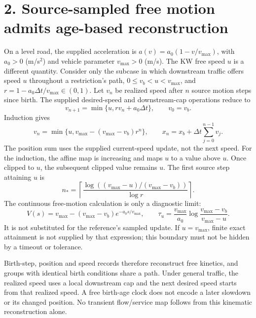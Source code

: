 \documentclass[11pt,a4paper]{article}
\begin{document}
\newpage
\section*{2. Source-sampled free motion admits age-based reconstruction}
On a level road, the supplied acceleration is
$a(v)=a_0(1-v/v_{\max})$, with $a_0>0$ (m/s$^2$) and vehicle parameter
$v_{\max}>0$ (m/s). The KW free speed $u$ is a different quantity.
Consider only the subcase in which downstream traffic offers speed $u$
throughout a restriction's path, $0\le v_b<u<v_{\max}$, and
$r=1-a_0\Delta t/v_{\max}\in(0,1)$.
Let $v_n$ be realized speed after $n$ source motion steps since birth.
The supplied desired-speed and downstream-cap operations reduce to
\begin{equation}
 v_{n+1}=\min\{u,rv_n+a_0\Delta t\},\qquad v_0=v_b.
\end{equation}
Induction gives
\begin{equation}
 v_n=\min\{u,v_{\max}-(v_{\max}-v_b)r^n\},\qquad
 x_n=x_b+\Delta t\sum_{j=0}^{n-1}v_j.
\end{equation}
The position sum uses the supplied current-speed update, not the next speed.
For the induction, the affine map is increasing and maps $u$ to a value
above $u$. Once clipped to $u$, the subsequent clipped value remains $u$.
The first source step attaining $u$ is
\begin{equation}
 n_* = \left\lceil
 \frac{\log((v_{\max}-u)/(v_{\max}-v_b))}{\log r}
 \right\rceil.
\end{equation}
The continuous free-motion calculation is only a diagnostic limit:
\begin{equation}
 V(s)=v_{\max}-(v_{\max}-v_b)e^{-a_0s/v_{\max}},\qquad
 \tau_u=\frac{v_{\max}}{a_0}
 \log\frac{v_{\max}-v_b}{v_{\max}-u}.
\end{equation}
It is not substituted for the reference's sampled update. If $u=v_{\max}$,
finite exact attainment is not supplied by that expression; this boundary
must not be hidden by a timeout or tolerance.

Birth-step, position and speed records therefore reconstruct free kinetics,
and groups with identical birth conditions share a path. Under general traffic,
the realized speed uses a local downstream cap and the next desired speed
starts from that realized speed. A free birth-age clock does not encode a
later slowdown or its changed position. No transient flow/service map follows
from this kinematic reconstruction alone.

\newpage
\end{document}
